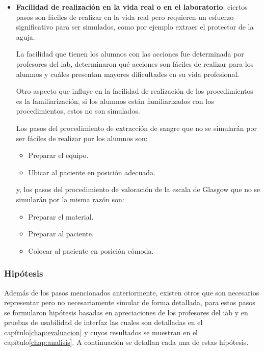 \begin{itemize}
    
\item \textbf{Facilidad de realización en la vida real o en el laboratorio}:
    ciertos pasos son fáciles de realizar en la vida real pero requieren un
    esfuerzo significativo para ser simulados, como por ejemplo extraer el 
    protector de la aguja.

    La facilidad que tienen los alumnos con las acciones fue determinada por
    profesores del \Gls{iab}, determinaron qué acciones son fáciles de
    realizar para los alumnos y cuáles presentan mayores dificultades en su
    vida profesional.

    Otro aspecto que influye en la facilidad de realización de los
    procedimientos es la familiarización, si los alumnos están
    familiarizados con los procedimientos, estos no son simulados.
        
    Los pasos del procedimiento de extracción de sangre que no se simularán por 
    ser fáciles de realizar por los alumnos son:
        
    \begin{itemize}
        \item Preparar el equipo.
        \item Ubicar al paciente en posición adecuada.
    \end{itemize}
    
    y, los pasos del procedimiento de valoración de la escala de Glasgow 
    que no se simularán por la misma razón son:
    \begin{itemize}
    \item Preparar el material.
    \item Preparar al paciente.
    \item Colocar al paciente en posición cómoda.
    \end{itemize}
        
\end{itemize}

\subsubsection{Hipótesis}

Además de los pasos mencionados anteriormente, existen otros que son necesarios 
representar pero no necesariamente simular de forma detallada, para estos 
pasos se formularon hipótesis basadas en apreciaciones de 
los profesores del \Gls{iab} y en pruebas de usabilidad de interfaz las cuales 
son detalladas en el capítulo\ref{chap:evaluacion} y cuyos resultados se muestran 
en el capítulo\ref{chap:analisis}. A continuación se detallan cada una de estas 
hipótesis.

